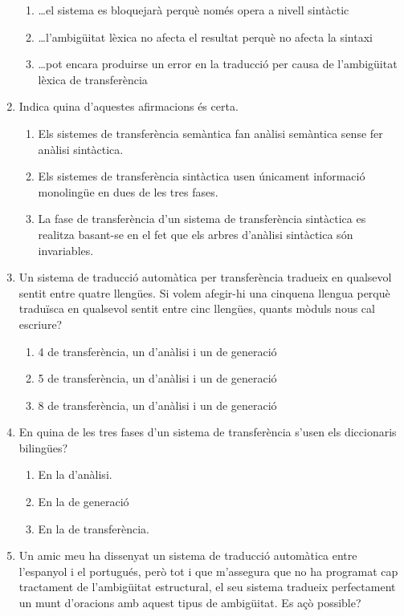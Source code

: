 \begin{enumerate}
\begin{enumerate}
\item {\ldots}el sistema es bloquejarà perquè només opera a nivell
      sintàctic
\item {\ldots}l'ambigüitat lèxica no afecta el resultat perquè no
      afecta la sintaxi
\item {\ldots}pot encara produirse un error en la traducció
      per causa de l'ambigüitat lèxica de transferència
\end{enumerate}

\item 
   Indica quina d'aquestes afirmacions és certa.
   
\begin{enumerate}
\item Els sistemes de transferència semàntica fan
     anàlisi semàntica sense fer anàlisi sintàctica.
\item Els sistemes de transferència sintàctica usen únicament 
     informació monolingüe en dues de les tres fases.
\item La fase de transferència d'un sistema de transferència
     sintàctica es realitza basant-se en el fet que els arbres
     d'anàlisi sintàctica són invariables.
\end{enumerate}
\item Un sistema de traducció automàtica per transferència tradueix en
qualsevol sentit entre quatre llengües. Si volem afegir-hi una
cinquena llengua perquè traduïsca en qualsevol sentit entre cinc
llengües, quants mòduls nous cal escriure?
\begin{enumerate}
\item 4 de transferència, un d'anàlisi i un de generació
\item 5 de transferència, un d'anàlisi i un de generació
\item 8 de transferència, un d'anàlisi i un de generació
\end{enumerate}

\item En quina de les tres fases d'un sistema de transferència s'usen
els diccionaris bilingües?
\begin{enumerate}
\item En la d'anàlisi.
\item En la de generació
\item En la de transferència.
\end{enumerate}


\item 
Un amic meu ha dissenyat un sistema de traducció automàtica entre
l'espanyol i el portugués, però tot i que m'assegura que no ha
programat cap tractament de l'ambigüitat estructural, el seu sistema
tradueix perfectament un munt d'oracions amb aquest tipus de
ambigüitat. Es açò possible? 


\end{enumerate}
